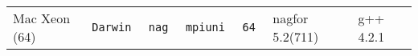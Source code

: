 \begin{tabular}{lllllll}
Mac Xeon (64)         &\tt Darwin &\tt nag          &\tt mpiuni     &\tt 64              & nagfor \footnotesize 5.2(711)       & g++ \footnotesize 4.2.1         \\ %

\end{tabular}
